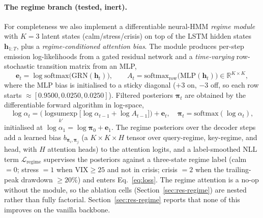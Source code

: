 \documentclass[11pt,a4paper]{article}
\begin{document}
\paragraph{The regime branch (tested, inert).} For completeness we also
implement a differentiable neural-HMM \emph{regime module} with $K=3$ latent
states (calm/stress/crisis) on top of the LSTM hidden states
$\mathbf{h}_{1:T}$, plus a \emph{regime-conditioned attention bias}. The module
produces per-step emission log-likelihoods from a gated residual network and a
\emph{time-varying} row-stochastic transition matrix from an MLP,
\begin{equation}
\mathbf{e}_t=\log\mathrm{softmax}\big(\mathrm{GRN}(\mathbf{h}_t)\big),\qquad
A_t=\mathrm{softmax}_{\mathrm{row}}\big(\mathrm{MLP}(\mathbf{h}_t)\big)\in\mathbb{R}^{K\times K},
\end{equation}
where the MLP bias is initialised to a sticky diagonal ($+3$ on, $-3$ off, so
each row starts $\approx[0.9500,0.0250,0.0250]$). Filtered posteriors
$\boldsymbol\pi_t$ are obtained by the differentiable forward algorithm in
log-space,
\begin{equation}
\log\alpha_t=\Big(\operatorname*{logsumexp}_{k'}\big[\log\alpha_{t-1}+\log A_{t-1}\big]\Big)+\mathbf{e}_t,
\quad
\boldsymbol\pi_t=\mathrm{softmax}(\log\alpha_t),
\end{equation}
initialised at $\log\alpha_1=\log\boldsymbol\pi_0+\mathbf{e}_1$. The regime
posteriors over the decoder steps add a learned bias
$b_{\boldsymbol\pi_i,\boldsymbol\pi_j}$ (a $K\times K\times H$ tensor over
query-regime, key-regime, and head, with $H$ attention heads) to the attention
logits, and a label-smoothed NLL term $\mathcal{L}_{\mathrm{regime}}$ supervises
the posteriors against a three-state regime label (calm $=0$; stress $=1$ when
$\mathrm{VIX}\ge 25$ and not in crisis; crisis $=2$ when the trailing-peak
drawdown $\ge 20\%$) and enters Eq.~\ref{eq:loss}. The regime
attention is a no-op without the module, so the ablation cells
(Section~\ref{sec:res-regime}) are nested rather than fully factorial.
Section~\ref{sec:res-regime} reports that none of this improves on the vanilla
backbone.
\end{document}
